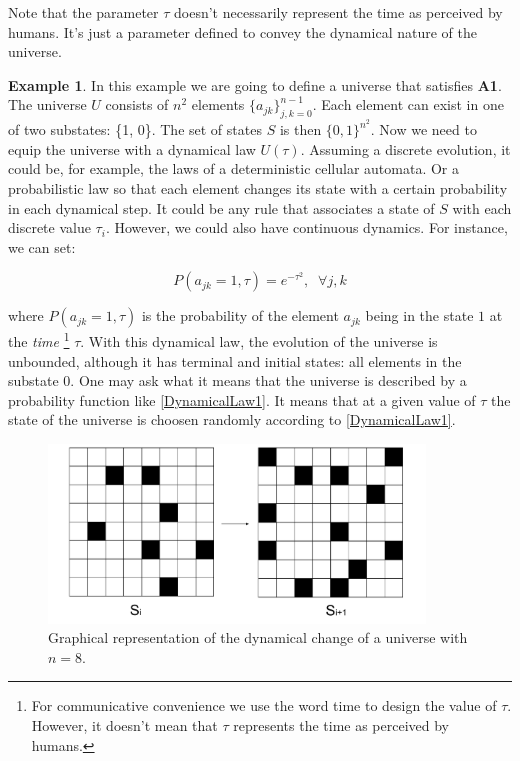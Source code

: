 \documentclass[11pt,a4paper,twoside]{report}
\newcommand{\+}{\textnormal{+} }
\theoremstyle{definition}
\newtheorem{myex}[mythm]{Example}
\numberwithin{equation}{chapter}
\begin{document}
Note that the parameter $\tau$ doesn't necessarily represent the time as
perceived by humans. It's just a parameter defined to convey the dynamical
nature of the universe.

\begin{myex}
  \label{example1}
In this example we are going to define a universe that satisfies \textbf{A1}.
The universe $U$ consists of $n^2$ elements $\{a_{jk}\}_{j,k=0}^{n-1}$. Each
element can exist in one of two substates: \{1, 0\}. The set of states $S$ is
then $\{0,1\}^{n^2}.$ Now we need to equip the universe with a dynamical law
$U(\tau)$. Assuming a discrete evolution, it could be, for example, the laws of
a deterministic cellular automata. Or a probabilistic law so that each element
changes its state with a certain probability in each dynamical step. It could be
any rule that associates a state of $S$ with each discrete value $\tau_i$.
However, we could also have continuous dynamics. For instance, we can set:

\begin{equation}
  P(a_{jk}=1,\tau)=e^{-\tau^2} ,\;\;\forall j,k 
  \label{DynamicalLaw1}
\end{equation}

where $P(a_{jk}=1, \tau)$ is the probability of the element $a_{jk}$ being in
the state $1$ at the \textit{time} \footnote{For communicative convenience we
use the word time to design the value of $\tau$. However, it doesn't mean that
$\tau$ represents the time as perceived by humans.} $\tau$. With this dynamical
law, the evolution of the universe is unbounded, although it has terminal and
initial states: all elements in the substate 0. One may ask what it means that
the universe is described by a probability function like \eqref{DynamicalLaw1}.
It means that at a given value of $\tau$ the state of the universe is choosen
randomly according to \eqref{DynamicalLaw1}.
\begin{figure}[t]
  \centering
  \includegraphics[width=100mm,scale=0.5]{figures/UniverseA1.pdf}
   \caption{Graphical representation of the dynamical change of a universe with
   $n=8$.}
\end{figure} 
\end{myex}
\end{document}
